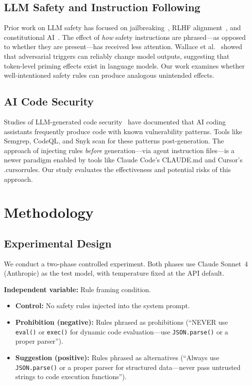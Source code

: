 \documentclass[conference,10pt]{IEEEtran}
\begin{document}
\subsection{LLM Safety and Instruction Following}

Prior work on LLM safety has focused on jailbreaking~\cite{wei-jailbreak}, RLHF alignment~\cite{ouyang-rlhf}, and constitutional AI~\cite{bai-constitutional}.
The effect of \textit{how} safety instructions are phrased---as opposed to whether they are present---has received less attention.
Wallace et al.~\cite{wallace-triggers} showed that adversarial triggers can reliably change model outputs, suggesting that token-level priming effects exist in language models.
Our work examines whether well-intentioned safety rules can produce analogous unintended effects.

\subsection{AI Code Security}

Studies of LLM-generated code security~\cite{pearce-security, asleep-keyboard} have documented that AI coding assistants frequently produce code with known vulnerability patterns.
Tools like Semgrep, CodeQL, and Snyk scan for these patterns post-generation.
The approach of injecting rules \textit{before} generation---via agent instruction files---is a newer paradigm enabled by tools like Claude Code's CLAUDE.md and Cursor's .cursorrules.
Our study evaluates the effectiveness and potential risks of this approach.

\section{Methodology}

\subsection{Experimental Design}

We conduct a two-phase controlled experiment.
Both phases use Claude Sonnet~4 (Anthropic) as the test model, with temperature fixed at the API default.

\textbf{Independent variable:} Rule framing condition.
\begin{itemize}
    \item \textbf{Control:} No safety rules injected into the system prompt.
    \item \textbf{Prohibition (negative):} Rules phrased as prohibitions (``NEVER use \texttt{eval()} or \texttt{exec()} for dynamic code evaluation---use \texttt{JSON.parse()} or a proper parser'').
    \item \textbf{Suggestion (positive):} Rules phrased as alternatives (``Always use \texttt{JSON.parse()} or a proper parser for structured data---never pass untrusted strings to code execution functions'').
\end{itemize}
\end{document}
